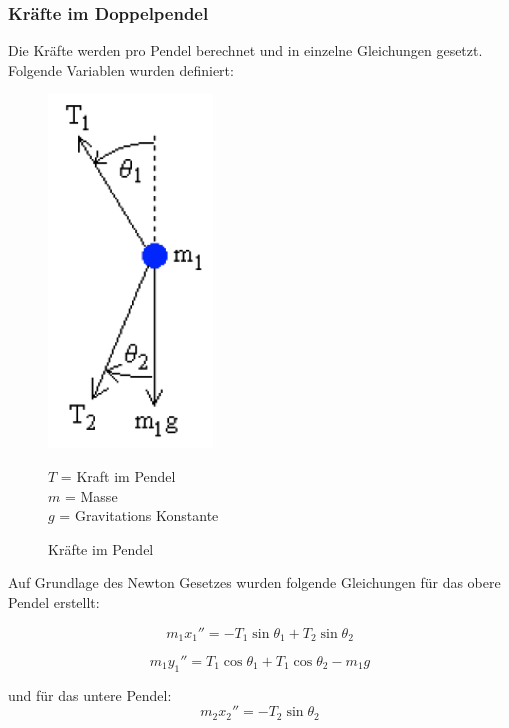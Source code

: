 \documentclass[12pt]{article}
\numberwithin{equation}{subsection}
\begin{document}
\subsubsection{Kräfte im Doppelpendel}
Die Kräfte werden pro Pendel berechnet und in einzelne Gleichungen gesetzt.
Folgende Variablen wurden definiert:

\begin{figure}[H]
	\begin{minipage}[!b]{0.4\textwidth}
		\centering
		\includegraphics[scale=1]{force.png}
		\caption{Kräfte im Pendel}
		\label{fig:force}
	\end{minipage}
	\begin{minipage}[!t]{\textwidth}
		\vspace{0pt}\raggedright
		$T$ = Kraft im Pendel\\
		$m$ = Masse\\
		$g$ = Gravitations Konstante
	\end{minipage}
\end{figure}

Auf Grundlage des Newton Gesetzes wurden folgende Gleichungen für das obere Pendel erstellt:

\begin{equation} \label{eq:force:1_1}
	m_1 x_1'' = -T_1\sin\theta_1 + T_2\sin\theta_2
\end{equation}

\begin{equation} \label{eq:force:1_2}
	m_1 y_1'' = T_1\cos\theta_1 + T_1\cos\theta_2 - m_1 g
\end{equation}

und für das untere Pendel:
\begin{equation} \label{eq:force:2_1}
	m_2 x_2'' = -T_2\sin\theta_2
\end{equation}
\end{document}
